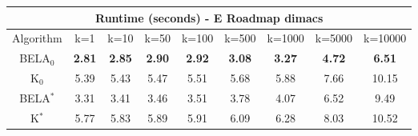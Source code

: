 \begin{tabular}{c|cccccccc}\toprule
\multicolumn{9}{c}{Runtime (seconds) - E Roadmap dimacs}\\ \midrule
Algorithm & k=1 & k=10 & k=50 & k=100 & k=500 & k=1000 & k=5000 & k=10000 \\ \midrule
BELA$_0$ & \textbf{2.81} & \textbf{2.85} & \textbf{2.90} & \textbf{2.92} & \textbf{3.08} & \textbf{3.27} & \textbf{4.72} & \textbf{6.51} \\
K$_0$ & 5.39 & 5.43 & 5.47 & 5.51 & 5.68 & 5.88 & 7.66 & 10.15 \\
BELA$^*$ & 3.31 & 3.41 & 3.46 & 3.51 & 3.78 & 4.07 & 6.52 & 9.49 \\
K$^*$ & 5.77 & 5.83 & 5.89 & 5.91 & 6.09 & 6.28 & 8.03 & 10.52 \\ \bottomrule 
\end{tabular}
